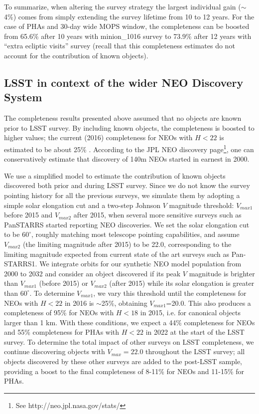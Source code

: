 To summarize, when altering the survey strategy the largest individual gain ($\sim$4\%)
comes from simply extending the survey lifetime from 10 to 12 years. For the case of PHAs and 30-day wide MOPS window,
the completeness can be boosted from 65.6\% after 10 years with minion\_1016 survey to 73.9\% after 12 years with
``extra ecliptic visits'' survey (recall that this completeness estimates do not account for the contribution of known objects).


\subsection{LSST in context of the wider NEO Discovery System\label{sec:known}}

The completeness results presented above assumed that no objects are known prior to LSST survey.
By including known objects, the completeness is boosted to higher values; the current (2016)
completeness for NEOs with $H<22$ is estimated to be about 25\% \citep{GMS2016}. According to the JPL NEO discovery page\footnote{See http://neo.jpl.nasa.gov/stats/}, one can conservatively estimate that
discovery of 140m NEOs started in earnest in 2000.

We use a simplified model to estimate the contribution of known objects discovered both prior
and during LSST survey. Since we do not know the
survey pointing history for all the previous surveys, we simulate them by adopting a simple solar elongation cut and a two-step Johnson $V$ magnitude threshold: $V_{max1}$ before 2015 and $V_{max2}$ after 2015, when several more sensitive surveys such as PanSTARRS started reporting NEO discoveries. We set the solar elongation cut to be $60^\circ$, roughly matching most telescope pointing capabilities, and assume $V_{max2}$ (the limiting magnitude after 2015) to be 22.0, corresponding to the limiting magnitude expected from current state of the art surveys such as Pan-STARRS1. We integrate orbits for our synthetic NEO model
population from 2000 to 2032 and consider an object discovered if its peak $V$ magnitude is brighter than $V_{max1}$ (before 2015) or $V_{max2}$ (after 2015) while its solar elongation is greater than $60^\circ$.  To determine $V_{max1}$, we vary this threshold until the completeness
for NEOs with $H<22$ in 2016 is $\sim$25\%, obtaining $V_{max1}$=20.0. This also
produces a completeness of 95\% for NEOs with $H<18$ in 2015, i.e. for canonical objects larger than 1 km.
With these conditions, we expect a 44\% completeness for NEOs
and 55\% completeness for PHAs with $H<22$ in 2022 at the start of the LSST survey. To determine the total impact of other surveys on LSST completeness, we continue discovering objects with $V_{max}=22.0$ throughout
the LSST survey; all objects discovered by these other surveys are added to the post-LSST sample, providing
a boost to the final completeness of 8-11\% for NEOs and 11-15\% for PHAs.

